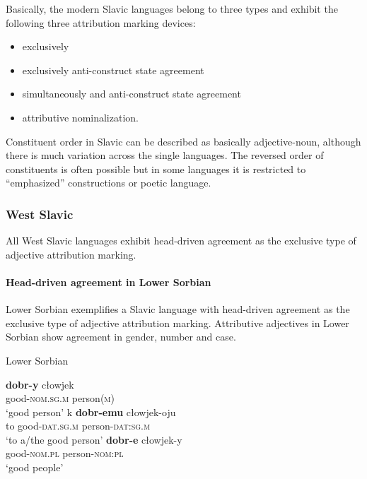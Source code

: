 Basically, the modern Slavic languages belong to three types and exhibit the following three attribution marking devices:
\begin{itemize}
\item exclusively 
\item exclusively anti\hyp{}construct state agreement
\item simultaneously  and anti\hyp{}construct state agreement
\item attributive nominalization.
\end{itemize}
Constituent order in Slavic can be described as basically adjective-noun, although there is much variation across the single languages. The reversed order of constituents is often possible but in some languages it is restricted to “emphasized” constructions or poetic language. 

\subsubsection{West Slavic}
All West Slavic languages exhibit head\hyp{}driven agreement as the exclusive type of adjective attribution marking.

\paragraph*{Head\hyp{}driven agreement in Lower Sorbian}
Lower Sorbian exemplifies a Slavic language with head\hyp{}driven agreement as the exclusive type of adjective attribution marking. Attributive adjectives in Lower Sorbian show agreement in gender, number and case. 
\begin{exe}
\ex \rm{Lower Sorbian \citep{janas1976}}
\begin{xlist}
\ex
\gll	\textbf{dobr-y} cłowjek\\
	good-\textsc{nom.sg.m} person(\textsc{m})\\
\glt	‘good person’
\ex
\gll	k \textbf{dobr-emu} cłowjek-oju\\
	to good-\textsc{dat.sg.m} person-\textsc{dat:sg.m}\\
\glt	‘to a/the good person’
\ex
\gll	\textbf{dobr-e} cłowjek-y\\
	good-\textsc{nom.pl} person-\textsc{nom:pl}\\
\glt	‘good people’
\end{xlist}
\end{exe}

